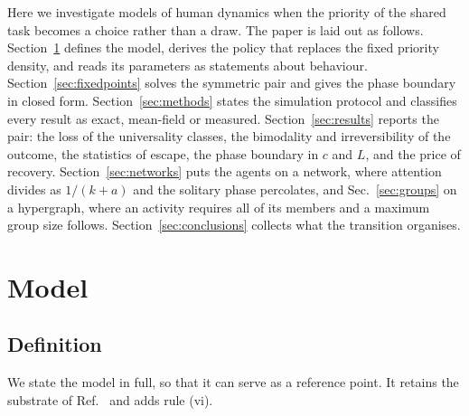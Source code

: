 \documentclass[aps,pre,twocolumn,superscriptaddress,floatfix,longbibliography]{revtex4-2}
\begin{document}
Here we investigate models of human dynamics when the priority of the
shared task becomes a choice rather than a draw. The paper is laid out as
follows.
Section~\ref{sec:model} defines the model, derives the policy that replaces the
fixed priority density, and reads its parameters as statements about behaviour.
Section~\ref{sec:fixedpoints} solves the symmetric pair and gives the phase
boundary in closed form. Section~\ref{sec:methods} states the simulation protocol
and classifies every result as exact, mean-field or measured.
Section~\ref{sec:results} reports the pair: the loss of the universality classes,
the bimodality and irreversibility of the outcome, the statistics of escape, the
phase boundary in $c$ and $L$, and the price of recovery.
Section~\ref{sec:networks} puts the
agents on a network, where attention divides as $1/(k+a)$ and the solitary phase
percolates, and Sec.~\ref{sec:groups} on a hypergraph, where an activity
requires all of its members and a maximum group size follows.
Section~\ref{sec:conclusions} collects what the transition organises.

\section{Model}
\label{sec:model}

\subsection{Definition}

We state the model in full, so that it can serve as a reference point. It
retains the substrate of Ref.~\cite{oliveira2009} and adds rule (vi).
\end{document}
